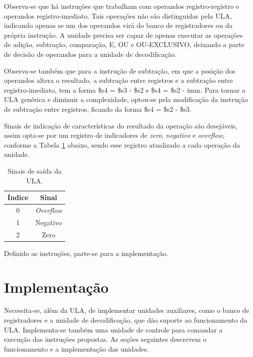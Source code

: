 \documentclass[11pt,a4paper,titlepage]{article}
\begin{document}
Observa-se que há instruções que trabalham com operandos registro-registro e operandos registro-imediato. Tais operações não são distinguidas pela ULA, indicando apenas se um dos operandos virá do banco de registradores ou da própria instrução. A unidade precisa ser capaz de apenas executar as operações de adição, subtração, comparação, E, OU e OU-EXCLUSIVO, deixando a parte de decisão de operandos para a unidade de decodificação.

Observa-se também que para a instrução de subtração, em que a posição dos operandos altera o resultado, a subtração entre registros e a subtração entre registro-imediato, tem a forma \$s4 = \$s3 - \$s2 e \$s4 = \$s2 - imm. Para tornar a ULA genérica e diminuir a complexidade, optou-se pela modificação da instrução de subtração entre registros, ficando da forma \$s4 = \$s2 - \$s3.

Sinais de indicação de características do resultado da operação são desejáveis, assim opta-se por um registro de indicadores de \textit{zero}, \textit{negativo} e \textit{overflow}, conforme a Tabela \ref{tab:flags} abaixo, sendo esse registro atualizado a cada operação da unidade.

\begin{table}[h]
\centering
\begin{tabular}{| c | c |}
\hline
Índice & Sinal\\
\hline
0 & \textit{Overflow}\\
\hline
1 & Negativo \\
\hline
2 & Zero\\
\hline
\end{tabular}
\caption{Sinais de saída da ULA.}
\label{tab:flags}
\end{table}
%

Definido as instruções, parte-se para a implementação.

\section{Implementação}

Necessita-se, além da ULA, de implementar unidades auxiliares, como o banco de registradores e a unidade de decodificação, que dão suporte ao funcionamento da ULA. Implementa-se também uma unidade de controle para comandar a execução das instruções propostas. As seções seguintes descrevem o funcionamento e a implementação das unidades.
\end{document}
